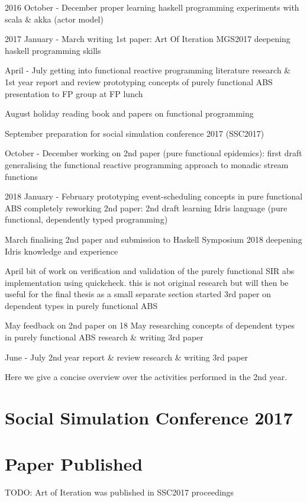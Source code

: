 2016
October - December
	proper learning haskell programming
	experiments with scala \& akka (actor model)
	
2017
January - March
	writing 1st paper: Art Of Iteration
	MGS2017
	deepening haskell programming skills

April - July
	getting into functional reactive programming
	literature research \& 1st year report and review
	prototyping concepts of purely functional ABS
	presentation to FP group at FP lunch

August
	holiday
	reading book and papers on functional programming

September
	preparation for social simulation conference 2017 (SSC2017)

October - December
	working on 2nd paper (pure functional epidemics): first draft
	generalising the functional reactive programming approach to monadic stream functions 

2018
January - February
	prototyping event-scheduling concepts in pure functional ABS
	completely reworking 2nd paper: 2nd draft
	learning Idris language (pure functional, dependently typed programming)

March
	finalising 2nd paper and submission to Haskell Symposium 2018
	deepening Idris knowledge and experience 

April
	bit of work on verification and validation of the purely functional SIR abs implementation using quickcheck. this is not original research but will then be useful for the final thesis as a small separate section
	started 3rd paper on dependent types in purely functional ABS

May
	feedback on 2nd paper on 18 May	
	researching concepts of dependent types in purely functional ABS
	research \& writing 3rd paper

June - July
	2nd year report \& review
	research \& writing 3rd paper




Here we give a concise overview over the activities performed in the 2nd year.

\section{Social Simulation Conference 2017}


\section{Paper Published}
TODO: Art of Iteration was published in SSC2017 proceedings

